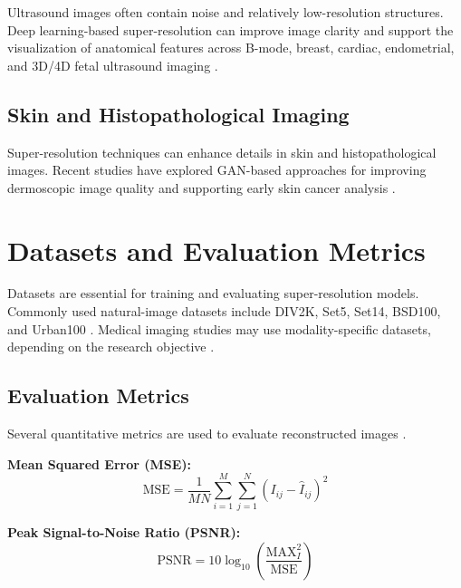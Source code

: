 \documentclass[conference]{IEEEtran}
\begin{document}
Ultrasound images often contain noise and relatively low-resolution structures. Deep learning-based super-resolution can improve image clarity and support the visualization of anatomical features across B-mode, breast, cardiac, endometrial, and 3D/4D fetal ultrasound imaging \cite{temiz2020decusr, tamang2022sscnn, iskandar2023fetalbrain, wang2024unsrgan, boumeridja2025fetal, andonotopo2026fetal8k, andonotopo2026realtime}.

\subsection{Skin and Histopathological Imaging}

Super-resolution techniques can enhance details in skin and histopathological images. Recent studies have explored GAN-based approaches for improving dermoscopic image quality and supporting early skin cancer analysis \cite{ahmad2022multipath, nandal2024realesrgan, aghelan2024realesrgan, veeramani2025meligan}.

\section{Datasets and Evaluation Metrics}

Datasets are essential for training and evaluating super-resolution models. Commonly used natural-image datasets include DIV2K, Set5, Set14, BSD100, and Urban100 \cite{lim2017edsr, anwar2020survey, li2024survey}. Medical imaging studies may use modality-specific datasets, depending on the research objective \cite{ahmad2022multipath, nandal2024realesrgan, poudel2025srmri}.

\subsection{Evaluation Metrics}

Several quantitative metrics are used to evaluate reconstructed images \cite{arabboev2024metrics}.

\textbf{Mean Squared Error (MSE):}
\begin{equation}
\mathrm{MSE} = \frac{1}{MN}\sum_{i=1}^{M}\sum_{j=1}^{N}
\left(I_{ij}-\hat{I}_{ij}\right)^2
\end{equation}

\textbf{Peak Signal-to-Noise Ratio (PSNR):}
\begin{equation}
\mathrm{PSNR} = 10\log_{10}\left(\frac{\mathrm{MAX}_I^2}{\mathrm{MSE}}\right)
\end{equation}
\end{document}
